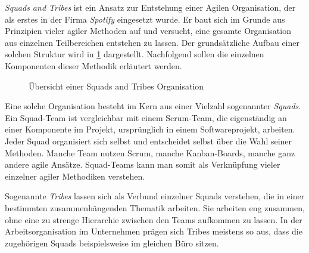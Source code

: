\textit{Squads and Tribes} ist ein Ansatz zur Entstehung einer Agilen Organisation, der als erstes in der Firma \textit{Spotify} eingesetzt wurde. Er baut sich im Grunde aus Prinzipien vieler agiler Methoden auf und versucht, eine gesamte Organisation aus einzelnen Teilbereichen entstehen zu lassen. Der grundsätzliche Aufbau einer solchen Struktur wird in \ref{fig:squadstribes} dargestellt. Nachfolgend sollen die einzelnen Komponenten dieser Methodik erläutert werden. 

\begin{figure}[H]
	\centering
	\caption[Übersicht einer Squads and Tribes Organisation]{Übersicht einer Squads and Tribes Organisation \protect \cite[S. 1]{kniberg_scaling_2012}}
	\label{fig:squadstribes}
\end{figure}

Eine solche Organisation besteht im Kern aus einer Vielzahl sogenannter \textit{Squads}. Ein Squad-Team ist vergleichbar mit einem Scrum-Team, die eigenständig an einer Komponente im Projekt, ursprünglich in einem Softwareprojekt, arbeiten. Jeder Squad organisiert sich selbst und entscheidet selbst über die Wahl seiner Methoden. Manche Team nutzen Scrum, manche Kanban-Boards, manche ganz andere agile Ansätze. Squad-Teams kann man somit als Verknüpfung vieler einzelner agiler Methodiken verstehen. \cite[S. 2]{kniberg_scaling_2012}

Sogenannte \textit{Tribes} lassen sich als Verbund einzelner Squads verstehen, die in einer bestimmten zusammenhängenden Thematik arbeiten. Sie arbeiten eng zusammen, ohne eine zu strenge Hierarchie zwischen den Teams aufkommen zu lassen. In der Arbeitsorganisation im Unternehmen prägen sich Tribes meistens so aus, dass die zugehörigen Squads beispielsweise im gleichen Büro sitzen.  \cite[S. 3]{kniberg_scaling_2012}

